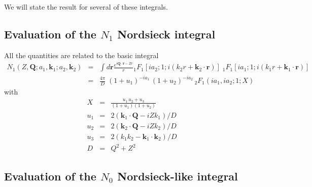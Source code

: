 We will state the result for several of these integrals.

\subsection{Evaluation of the $N_{1}$ Nordsieck integral}

All the quantities are related to the basic integral
%
\begin{eqnarray} \label{Q:N1}
N_{1} \left(Z,  \bm{Q} ; a_{1}, \bm{k}_{1} ; a_{2}, \bm{k}_{2} \right)
  &=& \int d \bm{r} \frac{e^{i \bm{Q} \cdot \bm{r} - Z
r}}{r} {_{1}F_{1}} \left[ i a_{2} ; 1 ;i \left(k_{2} r +
\bm{k}_{2}\cdot \bm{r} \right)\right] \; {_{1}F_{1}} \left[ i a_{1}
; 1 ;i \left(k_{1} r + \bm{k}_{1}\cdot \bm{r} \right)\right]
  \nonumber \\
 &=& \frac{4 \pi}{D} \; \left( 1 + u_{1} \right)^{-i
a_{1}} \, \left( 1 + u_{2} \right)^{-i a_{2}} \, {_{2}F_{1}}\left(
i a_{1} , i a_{2} ; 1 ; X \right)
\end{eqnarray}
with
\begin{eqnarray} \label{Q:XuD}
X &=& \frac{u_{1} \, u_{2} +u_{3}}{(1 + u_{1}) (1 + u_{2})} \nonumber
\\
u_{1} &=& 2 \left( \bm{k}_{1}\cdot \bm{Q} - i Z k_{1}
\right)/D \nonumber \\
u_{2} &=& 2 \left( \bm{k}_{2}\cdot \bm{Q} - i Z k_{2}
\right)/D \\
u_{3} &=& 2 \left( k_{1} k_{2} - \bm{k}_{1}\cdot \bm{k}_{2} \right)/D
 \nonumber \\
D &=& Q^{2} + Z^{2} \nonumber
\end{eqnarray}
%

\subsection{Evaluation of the $N_{0}$ Nordsieck-like integral}

